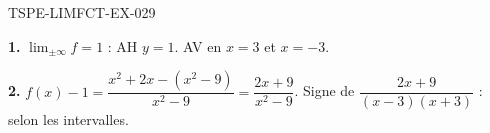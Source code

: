 \begin{corrige}{TSPE-LIMFCT-EX-029}

\textbf{1.} $\lim_{\pm\infty} f = 1$ : AH $y = 1$. AV en $x = 3$ et $x = -3$.

\textbf{2.} $f(x) - 1 = \dfrac{x^2+2x-(x^2-9)}{x^2-9} = \dfrac{2x+9}{x^2-9}$. Signe de $\dfrac{2x+9}{(x-3)(x+3)}$ : selon les intervalles.

\end{corrige}
